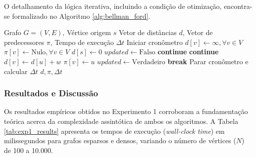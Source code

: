 \documentclass[10pt,a4paper]{article}
\begin{document}
O detalhamento da lógica iterativa, incluindo a condição de otimização, encontra-se formalizado no Algoritmo \ref{alg:bellman_ford}.

\begin{algorithm}[H]
\caption{Algoritmo de Bellman-Ford (com \textit{Early Stopping})}\label{alg:bellman_ford}
\begin{algorithmic}[1]
\Require Grafo $G = (V, E)$, Vértice origem $s$
\Ensure Vetor de distâncias $d$, Vetor de predecessores $\pi$, Tempo de execução $\Delta t$
\State Iniciar cronômetro
\State $d[v] \gets \infty, \forall v \in V$
\State $\pi[v] \gets \text{Nulo}, \forall v \in V$
\State $d[s] \gets 0$
    \State $updated \gets \text{Falso}$
            \State \textbf{continue}
        \EndIf
             
                \State \textbf{continue}
            \EndIf
                \State $d[v] \gets d[u] + w$
                \State $\pi[v] \gets u$
                \State $updated \gets \text{Verdadeiro}$
            \EndIf
        \EndFor
    \EndFor
        \State \textbf{break} 
    \EndIf
\EndFor
\State Parar cronômetro e calcular $\Delta t$
\State \Return $d, \pi, \Delta t$
\end{algorithmic}
\end{algorithm}

\subsubsection{Resultados e Discussão}

Os resultados empíricos obtidos no Experimento 1 corroboram a fundamentação teórica acerca da complexidade assintótica de ambos os algoritmos. A Tabela \ref{tab:exp1_results} apresenta os tempos de execução (\textit{wall-clock time}) em milissegundos para grafos esparsos e densos, variando o número de vértices ($N$) de 100 a 10.000.
\end{document}
